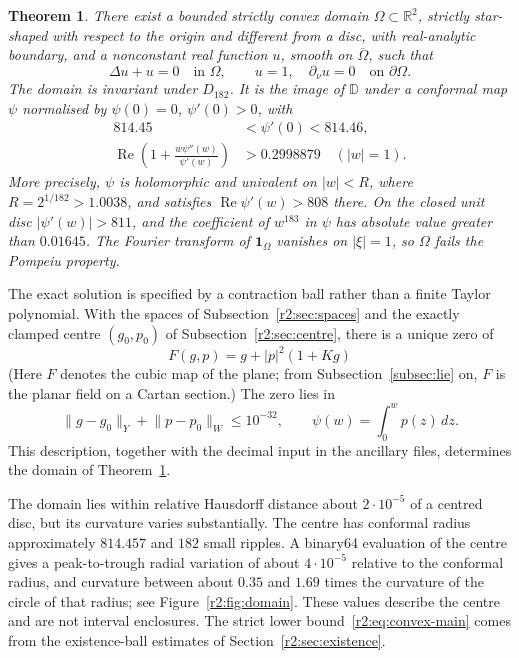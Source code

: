 \documentclass[11pt]{amsart}
\newtheorem{theorem}{Theorem}[section]
\theoremstyle{definition}
\theoremstyle{remark}
\numberwithin{equation}{section}
\newcommand{\R}{\mathbb{R}}
\newcommand{\D}{\mathbb{D}}
\newcommand{\one}{\mathbf{1}}
\DeclareMathOperator{\re}{Re}
\newcommand{\nrm}[1]{\lVert #1\rVert}
\begin{document}
\begin{theorem}\label{r2:thm:main}
There exist a bounded strictly convex domain $\Omega\subset\R^2$, strictly star-shaped with respect to the origin and different from a disc, with real-analytic boundary, and a nonconstant real function $u$, smooth on $\overline\Omega$, such that
\begin{equation}\label{r2:eq:main}
 \Delta u+u=0\quad\text{in }\Omega,\qquad
 u=1,\quad\partial_\nu u=0\quad\text{on }\partial\Omega.
\end{equation}
The domain is invariant under $D_{182}$. It is the image of $\D$ under a conformal map $\psi$ normalised by $\psi(0)=0$, $\psi'(0)>0$, with
\begin{align}
 814.45&<\psi'(0)<814.46,\label{r2:eq:radius-main}\\
 \re\left(1+\frac{w\psi''(w)}{\psi'(w)}\right)&>0.2998879
 \quad (|w|=1).\label{r2:eq:convex-main}
\end{align}
More precisely, $\psi$ is holomorphic and univalent on $|w|<R$, where $R=2^{1/182}>1.0038$, and satisfies $\re\psi'(w)>808$ there. On the closed unit disc $|\psi'(w)|>811$, and the coefficient of $w^{183}$ in $\psi$ has absolute value greater than $0.01645$.
The Fourier transform of $\one_\Omega$ vanishes on $|\xi|=1$, so $\Omega$ fails the Pompeiu property.
\end{theorem}

The exact solution is specified by a contraction ball rather than a finite Taylor polynomial. With the spaces of Subsection~\ref{r2:sec:spaces} and the exactly clamped centre $(g_0,p_0)$ of Subsection~\ref{r2:sec:centre}, there is a unique zero of
\begin{equation}\label{r2:eq:F-intro}
 F(g,p)=g+|p|^2(1+Kg)
\end{equation}
(Here $F$ denotes the cubic map of the plane; from Subsection~\ref{subsec:lie} on, $F$ is the planar field on a Cartan section.) The zero lies in
\[
 \nrm{g-g_0}_Y+\nrm{p-p_0}_W\le10^{-32},\qquad
 \psi(w)=\int_0^w p(z)\,dz.
\]
This description, together with the decimal input in the ancillary files, determines the domain of Theorem~\ref{r2:thm:main}. 

The domain lies within relative Hausdorff distance about $2\cdot10^{-5}$ of a centred disc, but its curvature varies substantially. The centre has conformal radius approximately $814.457$ and $182$ small ripples. A binary64 evaluation of the centre gives a peak-to-trough radial variation of about $4\cdot10^{-5}$ relative to the conformal radius, and curvature between about $0.35$ and $1.69$ times the curvature of the circle of that radius; see Figure~\ref{r2:fig:domain}. These values describe the centre and are not interval enclosures. The strict lower bound~\eqref{r2:eq:convex-main} comes from the existence-ball estimates of Section~\ref{r2:sec:existence}.
\end{document}
